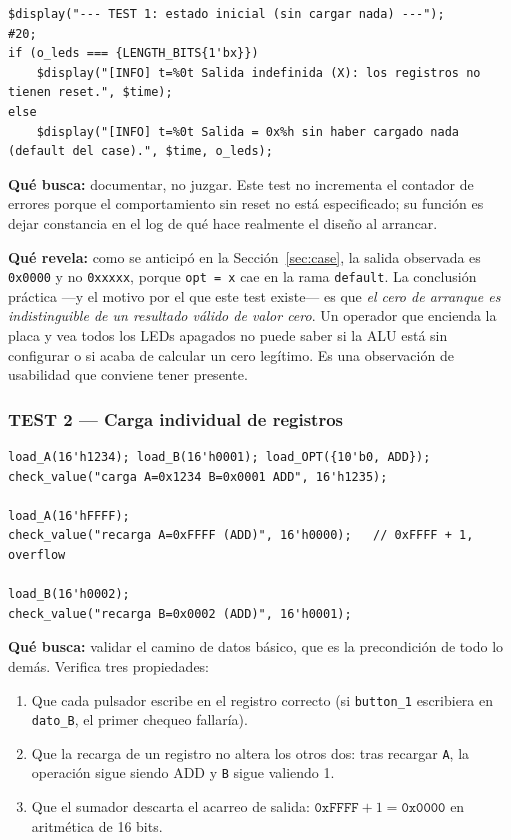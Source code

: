 \documentclass[12pt,a4paper]{article}
\begin{document}
\begin{lstlisting}[caption={Documentación del estado sin inicializar.}]
$display("--- TEST 1: estado inicial (sin cargar nada) ---");
#20;
if (o_leds === {LENGTH_BITS{1'bx}})
    $display("[INFO] t=%0t Salida indefinida (X): los registros no tienen reset.", $time);
else
    $display("[INFO] t=%0t Salida = 0x%h sin haber cargado nada (default del case).", $time, o_leds);
\end{lstlisting}

\textbf{Qué busca:} documentar, no juzgar. Este test no incrementa el contador
de errores porque el comportamiento sin reset no está especificado; su función
es dejar constancia en el log de qué hace realmente el diseño al arrancar.

\textbf{Qué revela:} como se anticipó en la Sección~\ref{sec:case}, la salida
observada es \texttt{0x0000} y no \texttt{0xxxxx}, porque \texttt{opt = x} cae
en la rama \texttt{default}. La conclusión práctica —y el motivo por el que este
test existe— es que \emph{el cero de arranque es indistinguible de un resultado
válido de valor cero}. Un operador que encienda la placa y vea todos los LEDs
apagados no puede saber si la ALU está sin configurar o si acaba de calcular un
cero legítimo. Es una observación de usabilidad que conviene tener presente.

\subsubsection{TEST 2 --- Carga individual de registros}

\begin{lstlisting}
load_A(16'h1234); load_B(16'h0001); load_OPT({10'b0, ADD});
check_value("carga A=0x1234 B=0x0001 ADD", 16'h1235);

load_A(16'hFFFF);
check_value("recarga A=0xFFFF (ADD)", 16'h0000);   // 0xFFFF + 1, overflow

load_B(16'h0002);
check_value("recarga B=0x0002 (ADD)", 16'h0001);
\end{lstlisting}

\textbf{Qué busca:} validar el camino de datos básico, que es la precondición de
todo lo demás. Verifica tres propiedades:

\begin{enumerate}[leftmargin=2em,itemsep=0.15em]
  \item Que cada pulsador escribe en el registro correcto (si \texttt{button\_1}
        escribiera en \texttt{dato\_B}, el primer chequeo fallaría).
  \item Que la recarga de un registro no altera los otros dos: tras recargar
        \texttt{A}, la operación sigue siendo ADD y \texttt{B} sigue valiendo 1.
  \item Que el sumador descarta el acarreo de salida:
        $\texttt{0xFFFF} + 1 = \texttt{0x0000}$ en aritmética de 16 bits.
\end{enumerate}
\end{document}
